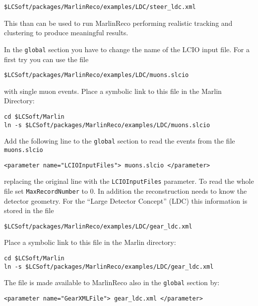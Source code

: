 \begin{verbatim}
$LCSoft/packages/MarlinReco/examples/LDC/steer_ldc.xml
\end{verbatim}

This than can be used to run MarlinReco performing realistic tracking and
clustering to produce meaningful results.

In the {\tt global} section you have to change the name of the
LCIO input file. For a first try you can use the file

\begin{verbatim}
$LCSoft/packages/MarlinReco/examples/LDC/muons.slcio
\end{verbatim}

with single muon events. Place a symbolic link to this file in the
Marlin Directory:

\begin{verbatim}
cd $LCSoft/Marlin
ln -s $LCSoft/packages/MarlinReco/examples/LDC/muons.slcio
\end{verbatim}

Add the following
line to the {\tt global} section to read the events from
the file {\tt muons.slcio}

\begin{verbatim}
<parameter name="LCIOInputFiles"> muons.slcio </parameter>
\end{verbatim}

replacing the original line with the {\tt LCIOInputFiles} parameter.
To read the whole file set {\tt MaxRecordNumber} to 0. In addition the
reconstruction needs to know the detector geometry.
For the ``Large Detector Concept'' (LDC) this information is stored
in the file

\begin{verbatim}
$LCSoft/packages/MarlinReco/examples/LDC/gear_ldc.xml
\end{verbatim}

Place a symbolic link to this file in the Marlin directory:

\begin{verbatim}
cd $LCSoft/Marlin
ln -s $LCSoft/packages/MarlinReco/examples/LDC/gear_ldc.xml
\end{verbatim}

The file is made available to
MarlinReco also in the {\tt global} section by:

\begin{verbatim}
<parameter name="GearXMLFile"> gear_ldc.xml </parameter>
\end{verbatim}

